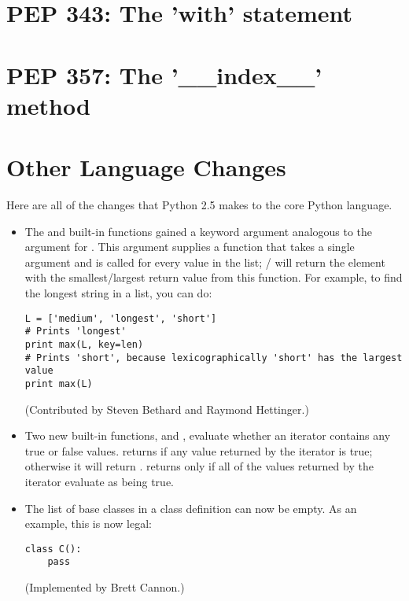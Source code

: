 \documentclass{howto}
\begin{document}
\section{PEP 343: The 'with' statement}



\section{PEP 357: The '__index__' method}



\section{Other Language Changes}

Here are all of the changes that Python 2.5 makes to the core Python
language.

\begin{itemize}

\item The  and  built-in functions
gained a  keyword argument analogous to the 
argument for .  This argument supplies a function
that takes a single argument and is called for every value in the list; 
/ will return the element with the 
smallest/largest return value from this function.
For example, to find the longest string in a list, you can do:

\begin{verbatim}
L = ['medium', 'longest', 'short']
# Prints 'longest'
print max(L, key=len)		   
# Prints 'short', because lexicographically 'short' has the largest value
print max(L)         
\end{verbatim}

(Contributed by Steven Bethard and Raymond Hettinger.)

\item Two new built-in functions,  and
, evaluate whether an iterator contains any true or
false values.   returns  if any value
returned by the iterator is true; otherwise it will return
.   returns  only if
all of the values returned by the iterator evaluate as being true.



\item The list of base classes in a class definition can now be empty.  
As an example, this is now legal:

\begin{verbatim}
class C():
    pass
\end{verbatim}
(Implemented by Brett Cannon.)

\end{itemize}
\end{document}
